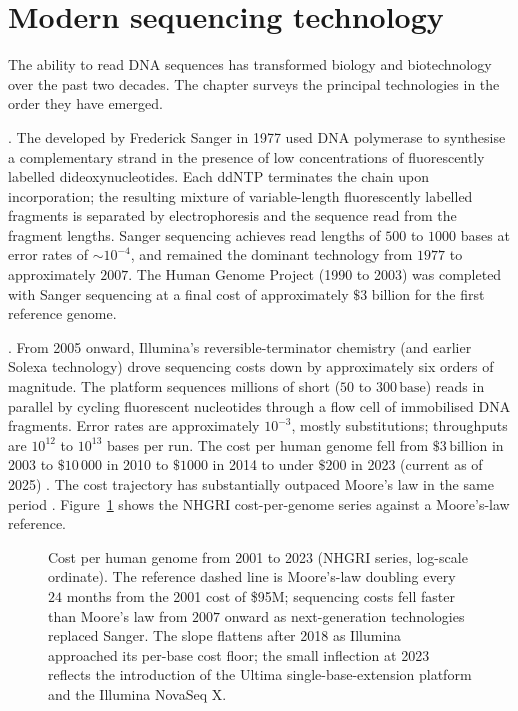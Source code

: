 \section{Modern sequencing technology}

The ability to read DNA sequences has transformed biology and
biotechnology over the past two decades. The chapter surveys the
principal technologies in the order they have emerged.

. The 
developed by Frederick Sanger in 1977 \cite{paper:v6c03-sanger-1977}
used DNA polymerase to synthesise a complementary strand in the
presence of low concentrations of fluorescently labelled
dideoxynucleotides. Each ddNTP terminates the chain upon
incorporation; the resulting mixture of variable-length fluorescently
labelled fragments is separated by electrophoresis and the sequence
read from the fragment lengths. Sanger sequencing achieves read
lengths of $500$ to $1000$ bases at error rates of $\sim 10^{-4}$,
and remained the dominant technology from $1977$ to approximately
$2007$. The Human Genome Project (1990 to 2003) was completed with
Sanger sequencing at a final cost of approximately $\$3$ billion for
the first reference genome.

. From 2005 onward,
Illumina's reversible-terminator chemistry (and earlier Solexa
technology) \cite{paper:v6c03-bentley-2008} drove sequencing costs
down by approximately six orders of magnitude. The platform sequences
millions of short ($50$ to $300\,\text{base}$) reads in parallel by
cycling fluorescent nucleotides through a flow cell of immobilised
DNA fragments. Error rates are approximately $10^{-3}$, mostly
substitutions; throughputs are $10^{12}$ to $10^{13}$ bases per run.
The cost per human genome fell from $\$3\,\text{billion}$ in 2003 to
$\$10\,000$ in 2010 to $\$1000$ in 2014 to under $\$200$ in 2023
(current as of 2025) \cite{paper:v6c03-nhgri-cost-2023}. The cost
trajectory has substantially outpaced Moore's law in the same period
\cite[ch.~12]{text:alon-systems-biology}. Figure~\ref{fig:seq-cost}
shows the NHGRI cost-per-genome series against a Moore's-law
reference.

\begin{figure}[h]
\centering

\caption{Cost per human genome from 2001 to 2023 (NHGRI series,
log-scale ordinate). The reference dashed line is Moore's-law
doubling every $24$ months from the 2001 cost of \$95M; sequencing
costs fell faster than Moore's law from $2007$ onward as
next-generation technologies replaced Sanger. The slope flattens
after 2018 as Illumina approached its per-base cost floor; the small
inflection at 2023 reflects the introduction of the Ultima
single-base-extension platform and the Illumina NovaSeq X.}
\label{fig:seq-cost}
\end{figure}

